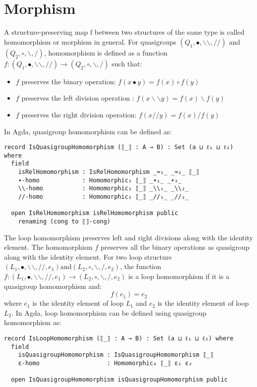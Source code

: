 \section{Morphism}
A structure-preserving map f between two structures of the same type is called
homomorphism or morphism in general. For quasigroups $(Q_1,∙,\backslash
\backslash ,//)$ and $(Q_2,\circ,\backslash ,/)$, homomorphism is defined as a
function \( f:(Q_1,∙,\backslash \backslash,//) \rightarrow
(Q_2,\circ,\backslash,/) \) such that:
\begin{itemize}
  \item $f$ preserves the binary operation: $f(x∙y) = f(x) \circ f(y)$
  \item $f$ preserves the left division operation : $f(x\backslash \backslash y) = f(x)\backslash f(y)$
  \item $f$ preserves the right division operation: $f(x//y) = f(x)/f(y)$
\end{itemize}

In Agda, quasigroup homomorphism can be defined as:

\begin{verbatim}
record IsQuasigroupHomomorphism (⟦_⟧ : A → B) : Set (a ⊔ ℓ₁ ⊔ ℓ₂) where
  field
    isRelHomomorphism : IsRelHomomorphism _≈₁_ _≈₂_ ⟦_⟧
    ∙-homo            : Homomorphic₂ ⟦_⟧ _∙₁_ _∙₂_
    \\-homo           : Homomorphic₂ ⟦_⟧ _\\₁_ _\\₂_
    //-homo           : Homomorphic₂ ⟦_⟧ _//₁_ _//₂_

  open IsRelHomomorphism isRelHomomorphism public
    renaming (cong to ⟦⟧-cong)
\end{verbatim}

The loop homomorphism preserves left and right divisions along with the identity
element. The homomorphism $f$ preserves all the binary operations as quasigroup
along with the identity element. For two loop structure $(L_1,∙,\backslash
\backslash,//,e_1) \text{and} (L_2,\circ,\backslash,/,e_2) $, the function \(
f:(L_1,∙,\backslash \backslash,//,e_1) \rightarrow (L_2,\circ,\backslash,/,e_2)
\) is a loop homomorphism if it is a quasigroup homomorphism and: 
\[f(e_1) = e_2\] where $e_1$ is the identity element of loop $L_1$ and $e_2$ is
the identity element of loop $L_2$. In Agda, loop homomorphism can be defined
using quasigroup homomorphism as:

\begin{verbatim}
record IsLoopHomomorphism (⟦_⟧ : A → B) : Set (a ⊔ ℓ₁ ⊔ ℓ₂) where
  field
    isQuasigroupHomomorphism : IsQuasigroupHomomorphism ⟦_⟧
    ε-homo                   : Homomorphic₀ ⟦_⟧ ε₁ ε₂

  open IsQuasigroupHomomorphism isQuasigroupHomomorphism public
\end{verbatim}


